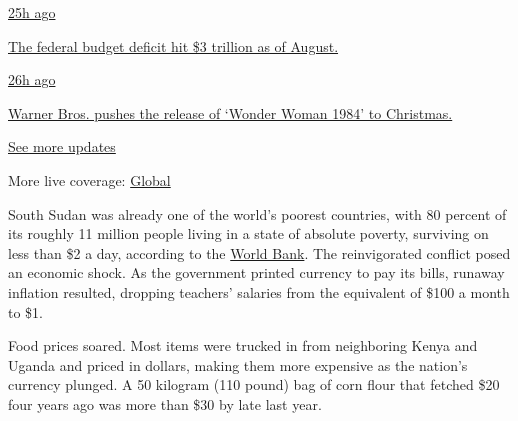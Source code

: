\href{https://www.nytimes3xbfgragh.onion/live/2020/09/11/business/stock-market-today-coronavirus?action=click\&pgtype=Article\&state=default\&region=MAIN_CONTENT_1\&context=storylines_live_updates\#the-federal-budget-deficit-hit-3-trillion-as-of-august}{25h
ago}

\href{https://www.nytimes3xbfgragh.onion/live/2020/09/11/business/stock-market-today-coronavirus?action=click\&pgtype=Article\&state=default\&region=MAIN_CONTENT_1\&context=storylines_live_updates\#the-federal-budget-deficit-hit-3-trillion-as-of-august}{The
federal budget deficit hit \$3 trillion as of August.}

\href{https://www.nytimes3xbfgragh.onion/live/2020/09/11/business/stock-market-today-coronavirus?action=click\&pgtype=Article\&state=default\&region=MAIN_CONTENT_1\&context=storylines_live_updates\#warner-bros-pushes-the-release-of-wonder-woman-1984-to-christmas}{26h
ago}

\href{https://www.nytimes3xbfgragh.onion/live/2020/09/11/business/stock-market-today-coronavirus?action=click\&pgtype=Article\&state=default\&region=MAIN_CONTENT_1\&context=storylines_live_updates\#warner-bros-pushes-the-release-of-wonder-woman-1984-to-christmas}{Warner
Bros. pushes the release of `Wonder Woman 1984' to Christmas.}

\href{https://www.nytimes3xbfgragh.onion/live/2020/09/11/business/stock-market-today-coronavirus?action=click\&pgtype=Article\&state=default\&region=MAIN_CONTENT_1\&context=storylines_live_updates}{See
more updates}

More live coverage:
\href{https://www.nytimes3xbfgragh.onion/2020/09/11/world/covid-19-coronavirus.html?action=click\&pgtype=Article\&state=default\&region=MAIN_CONTENT_1\&context=storylines_live_updates}{Global}

South Sudan was already one of the world's poorest countries, with 80
percent of its roughly 11 million people living in a state of absolute
poverty, surviving on less than \$2 a day, according to the
\href{https://www.worldbank.org/en/country/southsudan/publication/south-sudan-economic-update-peace-agreement-spurs-economic-recovery-but-poverty-remains}{World
Bank}. The reinvigorated conflict posed an economic shock. As the
government printed currency to pay its bills, runaway inflation
resulted, dropping teachers' salaries from the equivalent of \$100 a
month to \$1.

Food prices soared. Most items were trucked in from neighboring Kenya
and Uganda and priced in dollars, making them more expensive as the
nation's currency plunged. A 50 kilogram (110 pound) bag of corn flour
that fetched \$20 four years ago was more than \$30 by late last year.

